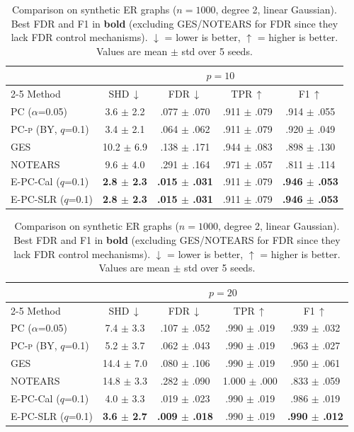 \documentclass[11pt]{article}
\newcommand{\epc}{\textsc{E-PC}}
\newcommand{\pcp}{\textsc{PC-p}}
\begin{document}
\begin{table}[t]
\caption{Comparison on synthetic ER graphs ($n = 1000$, degree 2, linear Gaussian). Best FDR and F1 in \textbf{bold} (excluding GES/NOTEARS for FDR since they lack FDR control mechanisms). $\downarrow$ = lower is better, $\uparrow$ = higher is better. Values are mean $\pm$ std over 5 seeds.}
\label{tab:main}
\centering
\small
\begin{tabular}{l cccc}
\toprule
 & \multicolumn{4}{c}{$p = 10$} \\
\cmidrule(lr){2-5}
Method & SHD\,$\downarrow$ & FDR\,$\downarrow$ & TPR\,$\uparrow$ & F1\,$\uparrow$ \\
\midrule
PC ($\alpha$=0.05) & 3.6 $\pm$ 2.2 & .077 $\pm$ .070 & .911 $\pm$ .079 & .914 $\pm$ .055 \\
\pcp{} (BY, $q$=0.1) & 3.4 $\pm$ 2.1 & .064 $\pm$ .062 & .911 $\pm$ .079 & .920 $\pm$ .049 \\
GES & 10.2 $\pm$ 6.9 & .138 $\pm$ .171 & .944 $\pm$ .083 & .898 $\pm$ .130 \\
NOTEARS & 9.6 $\pm$ 4.0 & .291 $\pm$ .164 & .971 $\pm$ .057 & .811 $\pm$ .114 \\
\epc{}-Cal ($q$=0.1) & \textbf{2.8 $\pm$ 2.3} & \textbf{.015 $\pm$ .031} & .911 $\pm$ .079 & \textbf{.946 $\pm$ .053} \\
\epc{}-SLR ($q$=0.1) & \textbf{2.8 $\pm$ 2.3} & \textbf{.015 $\pm$ .031} & .911 $\pm$ .079 & \textbf{.946 $\pm$ .053} \\
\bottomrule
\end{tabular}

\vspace{0.5em}

\begin{tabular}{l cccc}
\toprule
 & \multicolumn{4}{c}{$p = 20$} \\
\cmidrule(lr){2-5}
Method & SHD\,$\downarrow$ & FDR\,$\downarrow$ & TPR\,$\uparrow$ & F1\,$\uparrow$ \\
\midrule
PC ($\alpha$=0.05) & 7.4 $\pm$ 3.3 & .107 $\pm$ .052 & .990 $\pm$ .019 & .939 $\pm$ .032 \\
\pcp{} (BY, $q$=0.1) & 5.2 $\pm$ 3.7 & .062 $\pm$ .043 & .990 $\pm$ .019 & .963 $\pm$ .027 \\
GES & 14.4 $\pm$ 7.0 & .080 $\pm$ .106 & .990 $\pm$ .019 & .950 $\pm$ .061 \\
NOTEARS & 14.8 $\pm$ 3.3 & .282 $\pm$ .090 & 1.000 $\pm$ .000 & .833 $\pm$ .059 \\
\epc{}-Cal ($q$=0.1) & 4.0 $\pm$ 3.3 & .019 $\pm$ .023 & .990 $\pm$ .019 & .986 $\pm$ .019 \\
\epc{}-SLR ($q$=0.1) & \textbf{3.6 $\pm$ 2.7} & \textbf{.009 $\pm$ .018} & .990 $\pm$ .019 & \textbf{.990 $\pm$ .012} \\
\bottomrule
\end{tabular}


\end{table}
\end{document}
